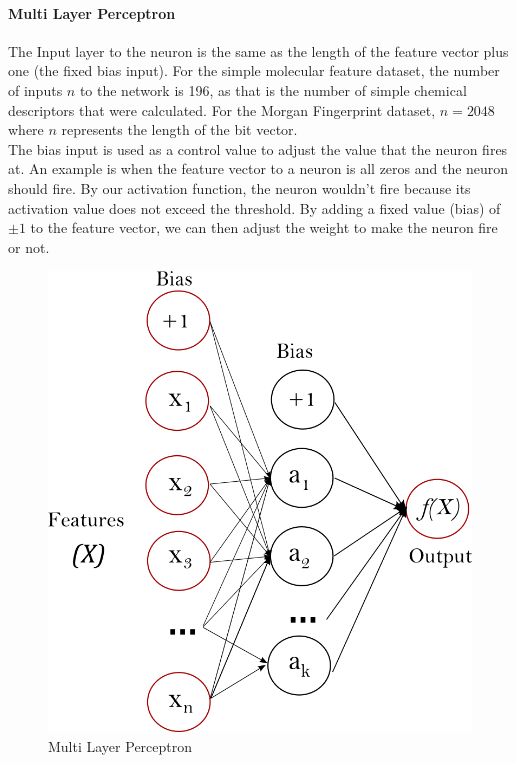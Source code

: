 \documentclass[a4paper,12pt]{report}
\begin{document}
			\paragraph{Multi Layer Perceptron}
			The Input layer to the neuron is the same as the length of the feature vector plus one (the fixed bias input). For the simple molecular feature dataset, the number of inputs $n$ to the network is 196, as that is the number of simple chemical descriptors that were calculated. For the Morgan Fingerprint dataset, $n = 2048$ where $n$ represents the length of the bit vector. \\
			The bias input is used as a control value to adjust the value that the neuron fires at. An example is when the feature vector to a neuron is all zeros and the neuron should fire. By our activation function, the neuron wouldn't fire because its activation value does not exceed the threshold. By adding a fixed value (bias) of $\pm1$ to the feature vector, we can then adjust the weight to make the neuron fire or not.
			\begin{figure}[H]
				\centering
				\includegraphics[width=\textwidth,scale=1,totalheight=0.5\textheight]{images/multilayerperceptronnetwork}
				\caption{Multi Layer Perceptron \cite{ScikitLearn2016}}
				\label{fig:mlp}
			\end{figure}
\end{document}
